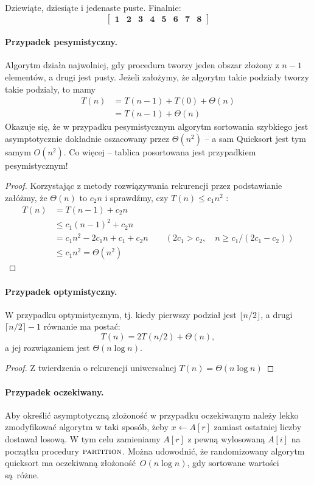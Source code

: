 \documentclass[10pt, oneside]{article}
\theoremstyle{remark}
\begin{document}
Dziewiąte, dziesiąte i jedenaste puste.
Finalnie:
$$\begin{bmatrix} \mathbf{1} & \mathbf{2} & \mathbf{3} & \mathbf{4} & \mathbf{5} & \mathbf{6} & \mathbf{7} & \mathbf{8} \end{bmatrix}$$

\paragraph{Przypadek pesymistyczny.} 
Algorytm działa najwolniej, gdy procedura tworzy jeden obszar złożony z $n-1$ elementów, a drugi jest pusty.
Jeżeli założymy, że algorytm takie podziały tworzy takie podziały, to mamy
\begin{align*}
	T(n) &= T(n-1) + T(0) + \Theta(n) \\
	&= T(n-1) + \Theta(n) 
\end{align*}
Okazuje się, że w przypadku pesymistycznym algorytm sortowania szybkiego jest asymptotycznie dokładnie oszacowany przez $\Theta(n^2)$ -- a sam Quicksort jest tym samym $O(n^2)$.
Co więcej -- tablica posortowana jest przypadkiem pesymistycznym!
\begin{proof}
Korzystając z metody rozwiązywania rekurencji przez podstawianie załóżmy, że $\Theta(n)$ to $c_2 n$ i sprawdźmy, czy $T(n) \leq c_1 n^2$ :
	\begin{align*}
	T(n) &= T(n-1) + c_2 n \\
	&\leq c_1(n-1)^2 + c_2 n \\
	&= c_1n^2 - 2c_1 n + c_1 + c_2 n \qquad (2c_1 > c_2, \quad n \geq c_1 / (2c_1-c_2))\\
	&\leq c_1 n^2 = \Theta(n^2)
\end{align*}	
\end{proof}

\paragraph{Przypadek optymistyczny.}
W przypadku optymistycznym, tj. kiedy pierwszy podział jest $\lfloor n/2 \rfloor$, a drugi $\lceil n/2 \rceil - 1$ równanie ma postać:
$$T(n) = 2 T(n/2) + \Theta(n),$$
a jej rozwiązaniem jest $\Theta(n \log n)$.
\begin{proof}
Z twierdzenia o rekurencji uniwersalnej $T(n) = \Theta(n \log n)$
\end{proof}

\paragraph{Przypadek oczekiwany.}
Aby określić asymptotyczną złożoność w przypadku oczekiwanym należy lekko zmodyfikować algorytm w taki sposób, żeby $x \gets A[r]$ zamiast ostatniej liczby dostawał losową.
W tym celu zamieniamy $A[r]$ z pewną wylosowaną $A[i]$ na początku procedury $\Call{partition}{}$.
Można udowodnić, że randomizowany algorytm quicksort ma oczekiwaną złożoność $O(n \log n)$, gdy sortowane wartości są różne.
\end{document}
